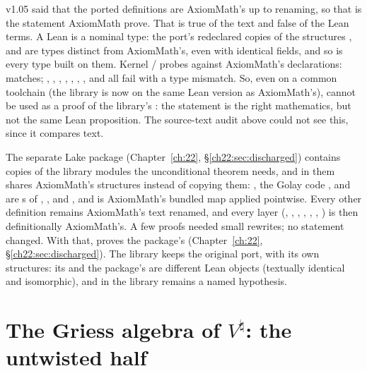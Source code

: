 \begin{warning}[title={Correction: textual identity is not definitional identity}]
v1.05 said that the ported definitions are AxiomMath's up to renaming, so that  is the statement AxiomMath
prove.  That is true of the text and false of the Lean terms.  A Lean  is a nominal type: the port's
redeclared copies of the structures ,  and  are types distinct from AxiomMath's, even
with identical fields, and so is every type built on them.  Kernel / probes against AxiomMath's
declarations:  matches; , , , ,
, , ,  and  all fail with a type mismatch.  So,
even on a common toolchain (the library is now on the same Lean version as AxiomMath's),  cannot be
used as a proof of the library's : the statement is the right mathematics, but not the same Lean
proposition.  The source-text audit above could not see this, since it compares text.

The separate Lake package  (Chapter~\ref{ch:22}, \S\ref{ch22:sec:discharged}) contains copies of the
library modules the unconditional theorem needs, and in them shares AxiomMath's structures instead of copying them: , the Golay code
,  and  are s of , ,
 and , and  is AxiomMath's bundled map applied
pointwise.  Every other definition remains AxiomMath's text renamed, and every layer (, ,
, , , , ) is then definitionally AxiomMath's.
A few proofs needed small rewrites; no statement changed.  With that,  proves the package's
 (Chapter~\ref{ch:22}, \S\ref{ch22:sec:discharged}).  The library keeps the original port, with its own
structures: its  and the package's are different Lean objects (textually identical and isomorphic), and in the
library  remains a named hypothesis.
\end{warning}

\section{The Griess algebra of \texorpdfstring{$V^\natural$}{V-natural}: the untwisted half}\label{ch21:sec:vnatside}

